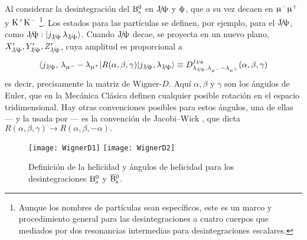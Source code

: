 Al considerar la desintegración del $\text{B}{}_{\text{s}}^{0}$ en $\text{J}\!/\!\uppsi$ y $\upphi$, que a su vez decaen en $\upmu{}^{-} \upmu{}^{+}$ y  $\text{K}{}^{+}\text{K}{}^{-}$ \footnote{Aunque los nombres de partículas sean específicos, este es un marco y procedimiento general para las desintegraciones a cuatro cuerpos que mediados por dos resonancias intermedias para desintegraciones escalares.}.
%
Los estados para las partículas se definen, por ejemplo, para el $\text{J}\!/\!\uppsi$, como $\text{J}\!/\!\uppsi:  |j_{\text{J}\!/\!\uppsi} \,\lambda_{\text{J}\!/\!\uppsi}\rangle$. Cuando $\text{J}\!/\!\uppsi$ decae, se proyecta en un nuevo plano, $X_{\text{J}\!/\!\uppsi}',Y_{\text{J}\!/\!\uppsi}',Z_{\text{J}\!/\!\uppsi}'$, cuya amplitud es proporcional a 
\begin{equation*}
\langle j_{\Jpsi},\, \lambda_{\muon} - \lambda_{\antimuon} | R(\alpha,\beta,\gamma) | j_{\Jpsi} , \lambda_{\Jpsi} \rangle \equiv D_{\lambda_{\Jpsi},\lambda_{\muon} - \lambda_{\antimuon}}^{j_{\Jpsi}}	(\alpha,\beta,\gamma)
\end{equation*}
es decir, precisamente la matriz de Wigner-$D$. Aquí $\alpha,\beta$ y $\gamma$
son los ángulos de Euler, que en la Mecánica Clásica  definen cualquier posible rotación en el espacio tridimensional. Hay otras convenciones posibles para estos ángulos, una de ellas --- y la usada por \lhcb --- es la convención de Jacobi--Wick \cite{kutschke1996angular}, que dicta
$R(\alpha,\beta,\gamma)  \rightarrow R(\alpha,\beta,-\alpha).  $


\begin{figure}[H]
\centering
\texttt{[image: WignerD1]}
\hfill
\texttt{[image: WignerD2]}
\caption{Definición de la helicidad y ángulos de helicidad para los desintegraciones $\text{B}{}_{\text{s}}^{0}$ y $\overline{\text{B}}{}_{\text{s}}^{0}$.}	
\end{figure}



